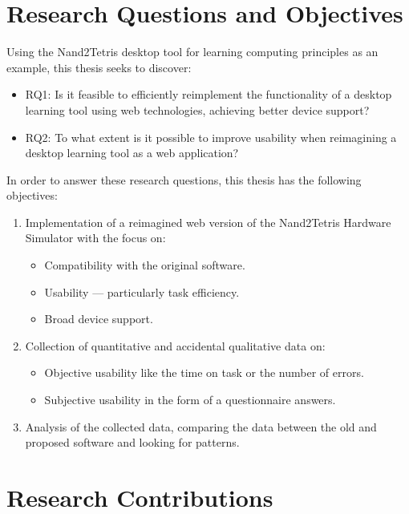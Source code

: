 \section{Research Questions and Objectives}

Using the Nand2Tetris desktop tool for learning computing principles as an example, this thesis seeks to discover:

\begin{itemize}
    \item RQ1: Is it feasible to efficiently reimplement the functionality of a desktop learning tool using web technologies, achieving better device support?
    \item RQ2: To what extent is it possible to improve usability when reimagining a desktop learning tool as a web application?
\end{itemize}

In order to answer these research questions, this thesis has the following objectives:

\begin{enumerate}
    \item Implementation of a reimagined web version of the Nand2Tetris Hardware Simulator with the focus on:
    \begin{itemize}
        \item Compatibility with the original software.
        \item Usability --- particularly task efficiency.
        \item Broad device support.
    \end{itemize}
    \item Collection of quantitative and accidental qualitative data on:
    \begin{itemize}
        \item Objective usability like the time on task or the number of errors.
        \item Subjective usability in the form of a questionnaire answers.
    \end{itemize}
    \item Analysis of the collected data, comparing the data between the old and proposed software and looking for patterns.
\end{enumerate}

\section{Research Contributions}

